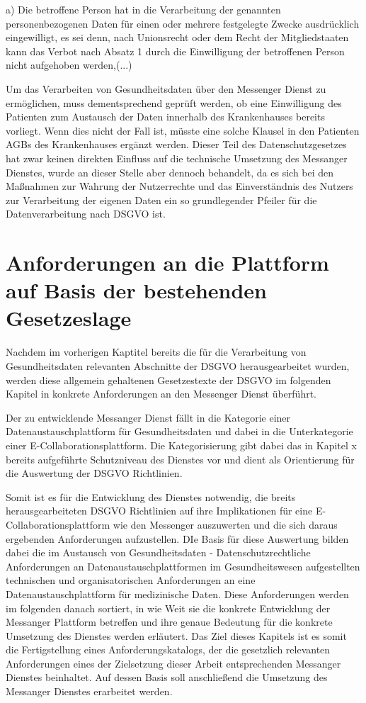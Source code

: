a) Die betroffene Person hat in die Verarbeitung der genannten personenbezogenen Daten für einen oder mehrere festgelegte Zwecke ausdrücklich eingewilligt, es sei denn, nach Unionsrecht oder dem Recht der Mitgliedstaaten kann das Verbot nach Absatz 1 durch die Einwilligung der betroffenen Person nicht aufgehoben werden,(...)

Um das Verarbeiten von Gesundheitsdaten über den Messenger Dienst zu ermöglichen, muss dementsprechend geprüft werden, ob eine Einwilligung des Patienten zum Austausch der Daten innerhalb des Krankenhauses bereits vorliegt. Wenn dies nicht der Fall ist, müsste eine solche Klausel in den Patienten AGBs des Krankenhauses ergänzt werden. Dieser Teil des Datenschutzgesetzes hat zwar keinen direkten Einfluss auf die technische Umsetzung des Messanger Dienstes, wurde an dieser Stelle aber dennoch behandelt, da es sich bei den Maßnahmen zur Wahrung der Nutzerrechte und das Einverständnis des Nutzers zur Verarbeitung der eigenen Daten ein so grundlegender Pfeiler für die Datenverarbeitung nach DSGVO ist.

\section{Anforderungen an die Plattform auf Basis der bestehenden Gesetzeslage}\label{section:aadpabsbg}
Nachdem im vorherigen Kaptitel bereits die für die Verarbeitung von Gesundheitsdaten relevanten Abschnitte der DSGVO herausgearbeitet wurden, werden diese allgemein gehaltenen Gesetzestexte der DSGVO im folgenden Kapitel in konkrete Anforderungen an den Messenger Dienst überführt. 

Der zu entwicklende Messanger Dienst fällt in die Kategorie einer Datenaustauschplattform für Gesundheitsdaten und dabei in die Unterkategorie einer E-Collaborationsplattform. Die Kategorisierung gibt dabei das in Kapitel x bereits aufgeführte Schutzniveau des Dienstes vor und dient als Orientierung für die Auswertung der DSGVO Richtlinien. 

Somit ist es für die Entwicklung des Dienstes notwendig, die breits herausgearbeiteten DSGVO Richtlinien auf ihre Implikationen für eine E-Collaborationsplattform wie den Messenger auszuwerten und die sich daraus ergebenden Anforderungen aufzustellen. 
DIe Basis für diese Auswertung bilden dabei die im Austausch von Gesundheitsdaten - Datenschutzrechtliche Anforderungen an Datenaustauschplattformen im Gesundheitswesen aufgestellten technischen und organisatorischen Anforderungen an eine Datenaustauschplattform für medizinische Daten. Diese Anforderungen werden im folgenden danach sortiert, in wie Weit sie die konkrete Entwicklung der Messanger Plattform betreffen und ihre genaue Bedeutung für die konkrete Umsetzung des Dienstes werden erläutert.
Das Ziel dieses Kapitels ist es somit die Fertigstellung eines Anforderungskatalogs, der die gesetzlich relevanten Anforderungen eines der Zielsetzung dieser Arbeit entsprechenden Messanger Dienstes beinhaltet. Auf dessen Basis soll anschließend die Umsetzung des Messanger Dienstes erarbeitet werden.

